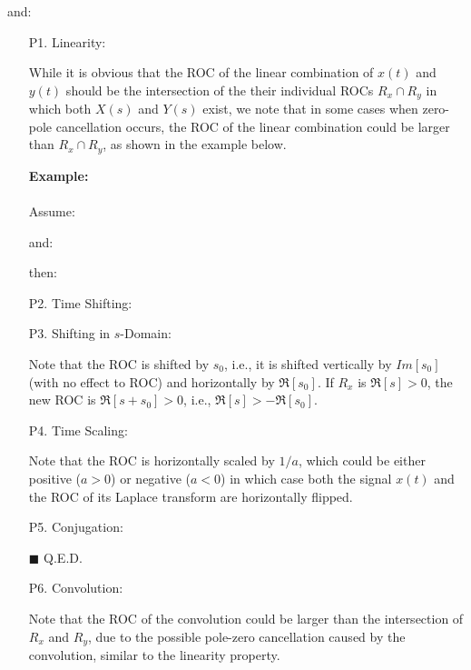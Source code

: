 	and:
	
	
	\begin{enumerate}
		\item[P1.] Linearity:
		
		While it is obvious that the ROC of the linear combination of $x(t)$ and $y(t)$ should be the intersection of the their individual ROCs $R_x \cap R_y$ in which both	$X(s)$ and $Y(s)$ exist, we note that in some cases when zero-pole cancellation occurs, the ROC of the linear combination could be larger than $R_x \cap R_y$, as  shown in the example below.
		
		\begin{tcolorbox}[colframe=black,colback=white,sharp corners]
		\textbf{{\Large {}}Example:}\\\\
		Assume:
		
		and:
		
		then:
		
		\end{tcolorbox}
		
		\item[P2.] Time Shifting:
		
		
		\item[P3.] Shifting in $s$-Domain:
		
		Note that the ROC is shifted by $s_0$, i.e., it is shifted vertically by $Im[s_0]$ (with no effect to ROC) and horizontally by $\Re[s_0]$. If $R_x$ is $\Re[s]>0$, the new ROC is $\Re[s+s_0]>0$, i.e., $\Re[s]>-\Re[s_0]$.
		
		\item[P4.] Time Scaling:
		
		Note that the ROC is horizontally scaled by $1/a$, which could be either positive ($a>0$) or negative ($a<0$) in which case both the signal $x(t)$ and the ROC of its Laplace transform are horizontally flipped. 
		
		\item[P5.] Conjugation:
		
		\begin{dem} 
		
		\begin{flushright}
			$\blacksquare$  Q.E.D.
		\end{flushright}
		\end{dem}
		
		\item[P6.] Convolution:
		
		Note that the ROC of the convolution could be larger than the intersection of $R_x$ and $R_y$, due to the possible pole-zero cancellation caused by the convolution, similar to the linearity property.
		

\end{enumerate}
